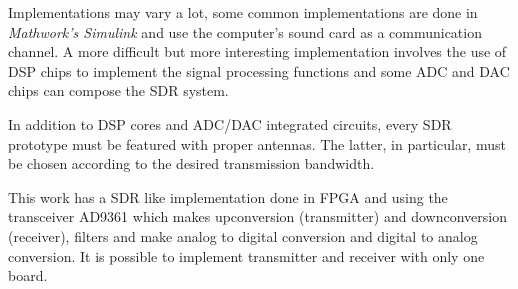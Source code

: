 Implementations may vary a lot, some common implementations are done in
\textit{Mathwork's Simulink} and use the computer’s sound card as a
communication channel. A more difficult but more interesting implementation
involves the use of DSP chips to implement the signal processing functions and
some ADC and DAC chips can compose the SDR system.

In addition to DSP cores and ADC/DAC integrated circuits, every SDR prototype
must be featured with proper antennas. The latter, in particular, must be
chosen according to the desired transmission bandwidth.

This work has a SDR like implementation done in FPGA and using the transceiver
AD9361 which makes upconversion (transmitter) and downconversion
(receiver), filters and make analog to digital conversion and digital to analog
conversion. It is possible to implement transmitter and receiver with only
one board.
